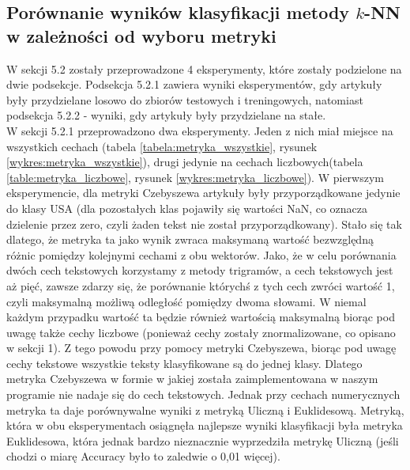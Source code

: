 \documentclass{classrep}
\begin{document}
\subsection{Porównanie wyników klasyfikacji metody $k$-NN w zależności od wyboru metryki}
W sekcji 5.2 zostały przeprowadzone 4 eksperymenty, które zostały podzielone na dwie podsekcje. Podsekcja 5.2.1 zawiera wyniki eksperymentów, gdy artykuły były przydzielane losowo do zbiorów testowych i treningowych, natomiast podsekcja 5.2.2 - wyniki, gdy artykuły były przydzielane na stałe.\\
\indent W sekcji 5.2.1 przeprowadzono dwa eksperymenty. Jeden z nich miał miejsce na wszystkich cechach (tabela \ref{tabela:metryka_wszystkie}, rysunek \ref{wykres:metryka_wszystkie}), drugi jedynie na cechach liczbowych(tabela \ref{table:metryka_liczbowe}, rysunek \ref{wykres:metryka_liczbowe}). W pierwszym eksperymencie, dla metryki Czebyszewa artykuły były przyporządkowane jedynie do klasy USA (dla pozostałych klas pojawiły się wartości NaN, co oznacza dzielenie przez zero, czyli żaden tekst nie został przyporządkowany). Stało się tak dlatego, że metryka ta jako wynik zwraca maksymaną wartość bezwzględną różnic pomiędzy kolejnymi cechami z obu wektorów. Jako, że w celu porównania dwóch cech tekstowych korzystamy z metody trigramów, a cech tekstowych jest aż pięć, zawsze zdarzy się, że porównanie którychś z tych cech zwróci wartość 1, czyli maksymalną możliwą odległość pomiędzy dwoma słowami. W niemal każdym przypadku wartość ta będzie również wartością maksymalną biorąc pod uwagę także cechy liczbowe (ponieważ cechy zostały znormalizowane, co opisano w sekcji 1). Z tego powodu przy pomocy metryki Czebyszewa, biorąc pod uwagę cechy tekstowe wszystkie teksty klasyfikowane są do jednej klasy. Dlatego metryka Czebyszewa w formie w jakiej została zaimplementowana w naszym programie nie nadaje się do cech tekstowych. Jednak przy cechach numerycznych metryka ta daje porównywalne wyniki z metryką Uliczną i Euklidesową. Metryką, która w obu eksperymentach osiągnęła najlepsze wyniki klasyfikacji była metryka Euklidesowa, która jednak bardzo nieznacznie wyprzedziła metrykę Uliczną (jeśli chodzi o miarę Accuracy było to zaledwie o 0,01 więcej).\\
\end{document}
